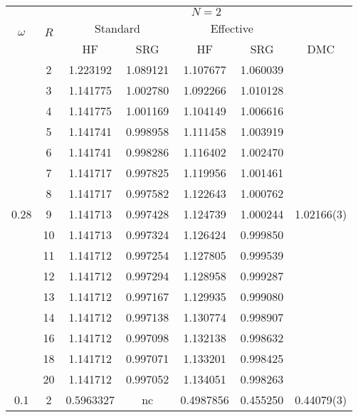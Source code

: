 \begin{table}[h!]
\begin{center}
\tabcolsep=0.35cm
\begin{tabular}{|c|c|c|c|c|c|c|}
\hline
\multirow{3}{*}{$\omega$} & \multirow{3}{*}{$R$} & \multicolumn{5}{|c|}{$N=2$} \\
& & \multicolumn{2}{|c|}{Standard} & \multicolumn{2}{|c|}{Effective} &  \\
& & HF & SRG & HF & SRG & DMC \\
\hline\hline
\multirow{15}{*}{0.28} & 2& 1.223192&1.089121 &1.107677 &1.060039 & \multirow{15}{*}{1.02166(3)} \\ %
& 3&1.141775 & 1.002780&1.092266 &1.010128 &\\
& 4&1.141775 &1.001169 &1.104149 &1.006616 & \\
& 5&1.141741 &0.998958 &1.111458 &1.003919 & \\
& 6&1.141741 &0.998286 &1.116402 &1.002470 & \\
& 7&1.141717 &0.997825 &1.119956 &1.001461 & \\
& 8&1.141717 &0.997582 &1.122643 &1.000762 & \\
& 9&1.141713 &0.997428 &1.124739 &1.000244 & \\
& 10&1.141713 &0.997324 &1.126424 & 0.999850 & \\
& 11&1.141712 &0.997254 &1.127805 & 0.999539 & \\
& 12&1.141712 &0.997294 &1.128958 &0.999287 & \\
& 13&1.141712 &0.997167 &1.129935 &0.999080 & \\ 
&14 & 1.141712 &0.997138 &1.130774 &0.998907 & \\
&16 &1.141712 &0.997098 &1.132138 &0.998632 & \\
&18&1.141712 &0.997071&1.133201 & 0.998425 & \\
&20&1.141712 &0.997052 &1.134051 &0.998263 & \\
\hline
\multirow{15}{*}{0.1} & 2&0.5963327 & nc&0.4987856 &0.455250 & \multirow{15}{*}{0.44079(3)} \\ %


\end{tabular}
\end{center}
\end{table}

